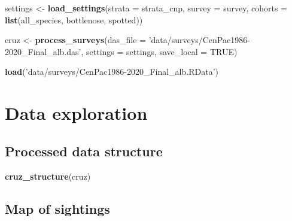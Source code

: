 \documentclass[
]{book}
\newenvironment{Shaded}{\begin{snugshade}}{\end{snugshade}}
\newcommand{\DataTypeTok}[1]{\textcolor[rgb]{0.13,0.29,0.53}{#1}}
\newcommand{\KeywordTok}[1]{\textcolor[rgb]{0.13,0.29,0.53}{\textbf{#1}}}
\newcommand{\NormalTok}[1]{#1}
\newcommand{\OtherTok}[1]{\textcolor[rgb]{0.56,0.35,0.01}{#1}}
\newcommand{\StringTok}[1]{\textcolor[rgb]{0.31,0.60,0.02}{#1}}
\begin{document}
\begin{Shaded}
\begin{Highlighting}[]
\NormalTok{settings <-}\StringTok{ }\KeywordTok{load_settings}\NormalTok{(}\DataTypeTok{strata =}\NormalTok{ strata_cnp,}
                          \DataTypeTok{survey =}\NormalTok{ survey,}
                          \DataTypeTok{cohorts =} \KeywordTok{list}\NormalTok{(all_species,}
\NormalTok{                                         bottlenose,}
\NormalTok{                                         spotted))}

\NormalTok{cruz <-}\StringTok{ }
\StringTok{  }\KeywordTok{process_surveys}\NormalTok{(}\DataTypeTok{das_file =} \StringTok{'data/surveys/CenPac1986-2020_Final_alb.das'}\NormalTok{,}
                  \DataTypeTok{settings =}\NormalTok{ settings,}
                  \DataTypeTok{save_local =} \OtherTok{TRUE}\NormalTok{) }
\end{Highlighting}
\end{Shaded}

\begin{Shaded}
\begin{Highlighting}[]
\KeywordTok{load}\NormalTok{(}\StringTok{'data/surveys/CenPac1986-2020_Final_alb.RData'}\NormalTok{)}
\end{Highlighting}
\end{Shaded}

\hypertarget{data-exploration-1}{%
\section*{Data exploration}\label{data-exploration-1}}

\hypertarget{processed-data-structure-1}{%
\subsection*{Processed data structure}\label{processed-data-structure-1}}

\begin{Shaded}
\begin{Highlighting}[]
\KeywordTok{cruz_structure}\NormalTok{(cruz)}
\end{Highlighting}
\end{Shaded}

\hypertarget{map-of-sightings-1}{%
\subsection*{Map of sightings}\label{map-of-sightings-1}}
\end{document}
